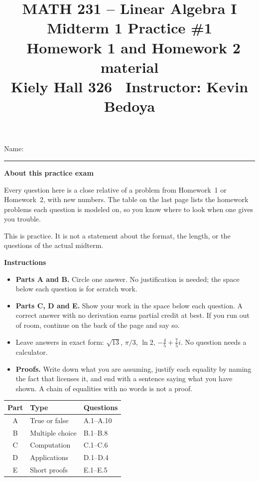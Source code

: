\documentclass[11pt]{article}
\title{\vspace{-1.2cm}\textbf{\sffamily MATH 231 -- Linear Algebra I}\\[4pt]
       {\large\sffamily Midterm 1 Practice \#1 \textbullet\ Homework 1 and
        Homework 2 material}\\[2pt]
       {\normalsize\sffamily Kiely Hall 326 \textbullet\
        Instructor: Kevin Bedoya}}
\author{}
\date{}
\newcounter{prob}[section]
\newenvironment{callout}[1]
  {\par\medskip\needspace{5\baselineskip}%
   \begin{lrbox}{\qcbox}%
   \begin{minipage}{\dimexpr\textwidth-2\fboxsep-4pt}%
   \setlength{\parskip}{0.4em}%
   \textbf{\sffamily\color{RoyalBlue}#1}\par}
  {\end{minipage}\end{lrbox}%
   \begin{center}\colorbox{softbg}{\usebox{\qcbox}}\end{center}\medskip}
\begin{document}
\maketitle
\vspace{-1.4cm}

\begin{center}
\large\sffamily Name: \rule{9cm}{0.4pt}
\end{center}

\begin{callout}{About this practice exam}
Every question here is a close relative of a problem from Homework~1 or
Homework~2, with new numbers. The table on the last page lists the homework
problems each question is modeled on, so you know where to look when one gives
you trouble.

This is practice. It is not a statement about the format, the length, or the
questions of the actual midterm.
\end{callout}

\begin{callout}{Instructions}
\begin{itemize}[leftmargin=1.4em,itemsep=5pt,topsep=3pt]
  \item \textbf{Parts A and B.} Circle one answer. No justification is needed;
        the space below each question is for scratch work.
  \item \textbf{Parts C, D and E.} Show your work in the space below each
        question. A correct answer with no derivation earns partial credit at
        best. If you run out of room, continue on the back of the page and say
        so.
  \item Leave answers in exact form: $\sqrt{13}$, $\pi/3$, $\ln2$,
        $-\tfrac45+\tfrac75 i$. No question needs a calculator.
  \item \textbf{Proofs.} Write down what you are assuming, justify each
        equality by naming the fact that licenses it, and end with a sentence
        saying what you have shown. A chain of equalities with no words is not a
        proof.
\end{itemize}
\end{callout}

\begin{center}
\renewcommand{\arraystretch}{1.3}
\begin{tabular}{@{}c l l@{}}
\toprule
\textbf{Part} & \textbf{Type} & \textbf{Questions} \\
\midrule
A & True or false   & A.1--A.10 \\
B & Multiple choice & B.1--B.8 \\
C & Computation     & C.1--C.6 \\
D & Applications    & D.1--D.4 \\
E & Short proofs    & E.1--E.5 \\
\bottomrule
\end{tabular}
\end{center}
\end{document}
